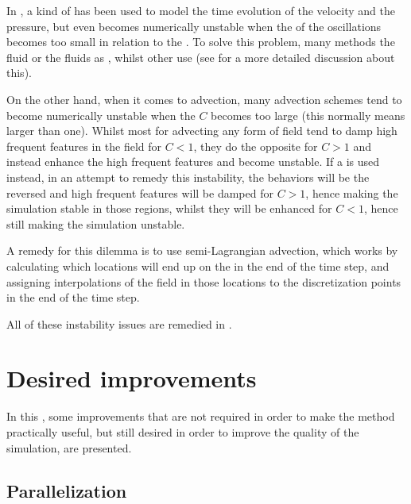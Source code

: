 In \thisprojectwork, a kind of  has been used to model the time evolution of the velocity and the pressure, but even  becomes numerically unstable when the \period of the oscillations becomes too small in relation to the \timestep. To solve this problem, many methods \approximate the fluid or the fluids as \incompressible, whilst other use  (see 
 for a more detailed discussion about this).

On the other hand, when it comes to advection, many advection schemes tend to become numerically unstable when the  $C$ becomes too large (this normally means larger than one). Whilst most  for advecting any form of field tend to damp high frequent features in the field for $C < 1$, they do the opposite for $C > 1$ and instead enhance the high frequent features and become unstable. If a  is used instead, in an attempt to remedy this instability, the behaviors will be the reversed and high frequent features will be damped for $C > 1$, hence making the simulation stable in those regions, whilst they will be enhanced for $C < 1$, hence still making the simulation unstable.

A remedy for this dilemma is to use semi-Lagrangian advection, which works by calculating which locations will end up on the  in the end of the time step, and assigning interpolations of the field in those locations to the discretization points in the end of the time step.

All of these instability issues are remedied in \citep{Stam1999}.

\section{Desired improvements}

In this \levelname, some improvements that are not required in order to make the method practically useful, but still desired in order to improve the quality of the simulation, are presented.

\subsection{Parallelization}

